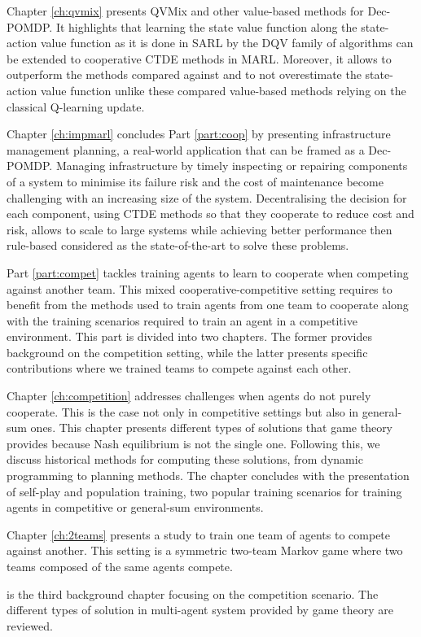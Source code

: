 Chapter \ref{ch:qvmix} presents QVMix and other value-based methods for Dec-POMDP.
It highlights that learning the state value function along the state-action value function as it is done in SARL by the DQV family of algorithms can be extended to cooperative CTDE methods in MARL.
Moreover, it allows to outperform the methods compared against and to not overestimate the state-action value function unlike these compared value-based methods relying on the classical Q-learning update.

Chapter \ref{ch:impmarl} concludes Part \ref{part:coop} by presenting infrastructure management planning, a real-world application that can be framed as a Dec-POMDP.
Managing infrastructure by timely inspecting or repairing components of a system to minimise its failure risk and the cost of maintenance become challenging with an increasing size of the system.
Decentralising the decision for each component, using CTDE methods so that they cooperate to reduce cost and risk, allows to scale to large systems while achieving better performance then rule-based considered as the state-of-the-art to solve these problems.

Part \ref{part:compet} tackles training agents to learn to cooperate when competing against another team.
This mixed cooperative-competitive setting requires to benefit from the methods used to train agents from one team to cooperate along with the training scenarios required to train an agent in a competitive environment.
This part is divided into two chapters. 
The former provides background on the competition setting, while the latter presents specific contributions where we trained teams to compete against each other.

Chapter \ref{ch:competition} addresses challenges when agents do not purely cooperate.
This is the case not only in competitive settings but also in general-sum ones.
This chapter presents different types of solutions that game theory provides because Nash equilibrium is not the single one.
Following this, we discuss historical methods for computing these solutions, from dynamic programming to planning methods.
The chapter concludes with the presentation of self-play and population training, two popular training scenarios for training agents in competitive or general-sum environments.

Chapter \ref{ch:2teams} presents a study to train one team of agents to compete against another.
This setting is a symmetric two-team Markov game where two teams composed of the same agents compete.



is the third background chapter focusing on the competition scenario.
The different types of solution in multi-agent system provided by game theory are reviewed.